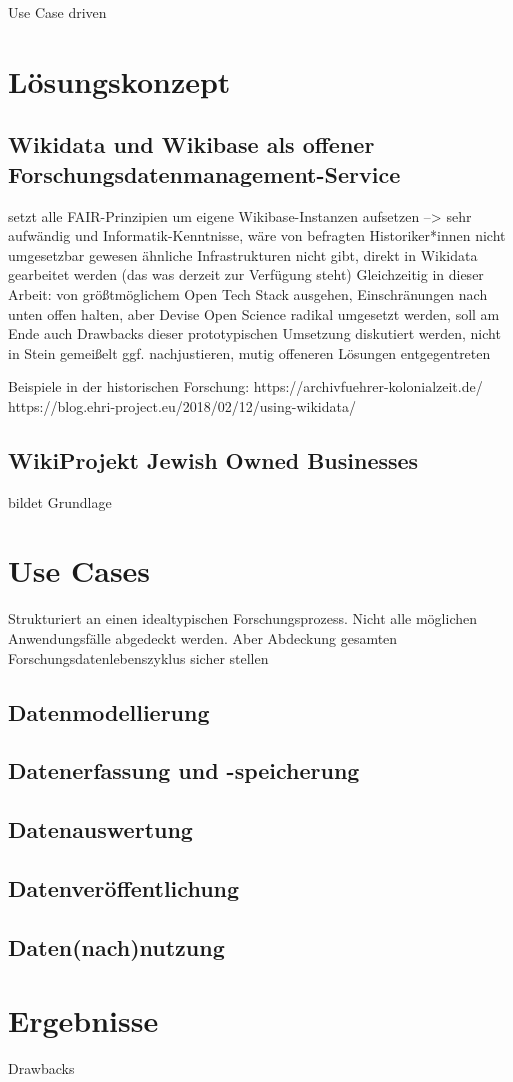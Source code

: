 \onehalfspacing

Use Case driven

\section{Lösungskonzept}
\subsection{Wikidata und Wikibase als offener Forschungsdatenmanagement-Service}
setzt alle FAIR-Prinzipien um
eigene Wikibase-Instanzen aufsetzen --> sehr aufwändig und Informatik-Kenntnisse, wäre von befragten Historiker*innen nicht umgesetzbar gewesen
ähnliche Infrastrukturen nicht gibt, direkt in Wikidata gearbeitet werden (das was derzeit zur Verfügung steht)
Gleichzeitig in dieser Arbeit: von größtmöglichem Open Tech Stack ausgehen, Einschränungen nach unten offen halten, aber Devise Open Science radikal umgesetzt werden, soll am Ende auch Drawbacks dieser prototypischen Umsetzung diskutiert werden, nicht in Stein gemeißelt ggf. nachjustieren, mutig offeneren Lösungen entgegentreten

Beispiele in der historischen Forschung:
https://archivfuehrer-kolonialzeit.de/
https://blog.ehri-project.eu/2018/02/12/using-wikidata/


\subsection{WikiProjekt Jewish Owned Businesses}
bildet Grundlage

\section{Use Cases}

Strukturiert an einen idealtypischen Forschungsprozess. Nicht alle möglichen Anwendungsfälle abgedeckt werden. Aber Abdeckung gesamten Forschungsdatenlebenszyklus sicher stellen

\subsection{Datenmodellierung}

\subsection{Datenerfassung und -speicherung}

\subsection{Datenauswertung}

\subsection{Datenveröffentlichung}

\subsection{Daten(nach)nutzung}

\section{Ergebnisse}

Drawbacks
